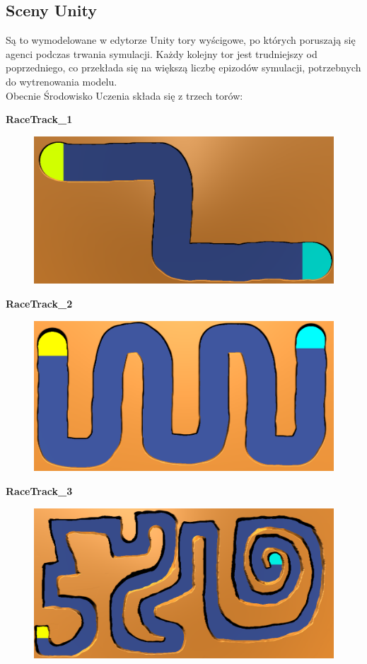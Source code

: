\subsection{Sceny Unity}
\label{UnityScenes}
Są to wymodelowane w edytorze Unity tory wyścigowe, po których poruszają się agenci podczas trwania symulacji. 
Każdy kolejny tor jest trudniejszy od poprzedniego, co przekłada się na większą liczbę epizodów symulacji, potrzebnych do wytrenowania modelu. \\
Obecnie Środowisko Uczenia składa się z trzech torów:
\newpage
\begin{center}
\textbf{\Large{RaceTrack\_1}}
\begin{figure}[H]
\centering
\includegraphics[width=13cm]{resources/figures/track_1.png}
\end{figure}

\textbf{\Large{RaceTrack\_2}}
\begin{figure}[H]
\centering
\includegraphics[width=13cm]{resources/figures/track_2.png}
\end{figure}

\textbf{\Large{RaceTrack\_3}}
\begin{figure}[H]
\centering
\includegraphics[width=13cm]{resources/figures/track_3.png}
\end{figure}
\end{center}


